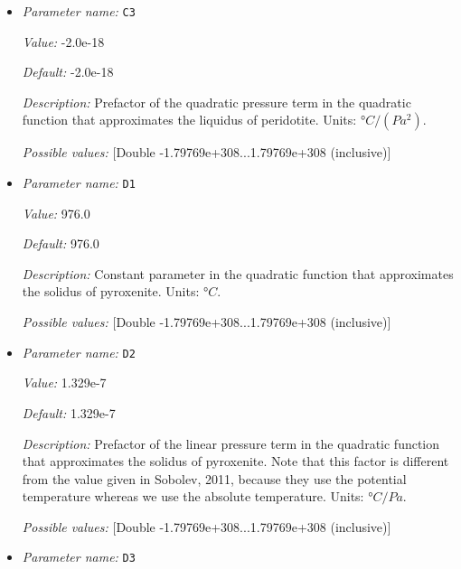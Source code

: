 \begin{itemize}
{\it Value:} 4.50e-8


{\it Default:} 4.50e-8


{\it Description:} Prefactor of the linear pressure term in the quadratic function that approximates the liquidus of peridotite. Units: $°C/Pa$.


{\it Possible values:} [Double -1.79769e+308...1.79769e+308 (inclusive)]
\item {\it Parameter name:} {\tt C3}
\label{parameters:Postprocess/Visualization/Melt fraction/C3}


{\it Value:} -2.0e-18


{\it Default:} -2.0e-18


{\it Description:} Prefactor of the quadratic pressure term in the quadratic function that approximates the liquidus of peridotite. Units: $°C/(Pa^2)$.


{\it Possible values:} [Double -1.79769e+308...1.79769e+308 (inclusive)]
\item {\it Parameter name:} {\tt D1}
\label{parameters:Postprocess/Visualization/Melt fraction/D1}


{\it Value:} 976.0


{\it Default:} 976.0


{\it Description:} Constant parameter in the quadratic function that approximates the solidus of pyroxenite. Units: $°C$.


{\it Possible values:} [Double -1.79769e+308...1.79769e+308 (inclusive)]
\item {\it Parameter name:} {\tt D2}
\label{parameters:Postprocess/Visualization/Melt fraction/D2}


{\it Value:} 1.329e-7


{\it Default:} 1.329e-7


{\it Description:} Prefactor of the linear pressure term in the quadratic function that approximates the solidus of pyroxenite. Note that this factor is different from the value given in Sobolev, 2011, because they use the potential temperature whereas we use the absolute temperature. Units: $°C/Pa$.


{\it Possible values:} [Double -1.79769e+308...1.79769e+308 (inclusive)]
\item {\it Parameter name:} {\tt D3}
\label{parameters:Postprocess/Visualization/Melt fraction/D3}



\end{itemize}

